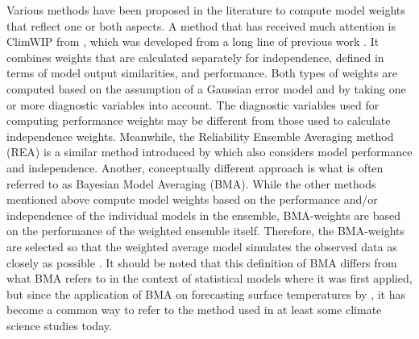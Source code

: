 Various methods have been proposed in the literature to compute model weights that reflect one or both aspects. 
A method that has received much attention is ClimWIP from \citet{brunnerReducedGlobalWarming2020}, which was developed from a long line of previous work \citep[e.g.,][]{sandersonRepresentativeDemocracyReduce2015, sandersonAddressingInterdependencyMultimodel2015,knuttiClimateModelProjection2017, lorenzProspectsCaveatsWeighting2018}.
It combines weights that are calculated separately for independence, defined in terms of model output similarities, and performance.
Both types of weights are computed based on the assumption of a Gaussian error model and by taking one or more diagnostic variables into account. The diagnostic variables used for computing performance weights may be different from those used to calculate independence weights. 
Meanwhile, the Reliability Ensemble Averaging method (REA) is a similar method introduced by  \citet{giorgiCalculationAverageUncertainty2002a} which also considers model performance and independence.
Another, conceptually different approach is what is often referred to as Bayesian Model Averaging (BMA). While the other methods mentioned above compute model weights based on the performance and/or independence of the individual models in the ensemble, BMA-weights are based on the performance of the weighted ensemble itself. Therefore, the BMA-weights are selected so that the weighted average model simulates the observed data as closely as possible \citep[e,g.][]{massoudBayesianModelAveraging2020,woottenEffectStatisticalDownscaling2020,massoudBayesianWeightingClimate2023,woottenAssessingSensitivitiesClimate2023}. 
It should be noted that this definition of BMA differs from what BMA refers to in the context of statistical models where it was first applied, but since the application of BMA on forecasting surface temperatures by \citet{rafteryUsingBayesianModel2005}, it has become a common way to refer to the method used in at least some climate science studies today.

